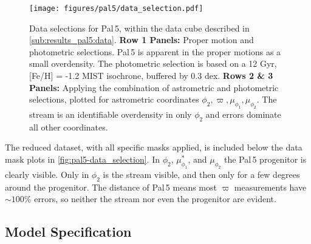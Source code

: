 \documentclass[twocolumn]{aastex631}
\newcommand{\stream}[1]{#1}
\newcommand{\parallax}{\varpi}
\begin{document}
        \begin{figure*}[ht]
            \centering
            \texttt{[image: figures/pal5/data\_selection.pdf]}
            \caption{%
                Data selections for \stream{Pal\,5}, within the data cube
                described in \autoref{sub:results_pal5:data}.
                \textbf{Row 1 Panels:}
                Proper motion and photometric selections.  \stream{Pal\,5} is
                apparent in the proper motions as a small overdensity. The
                photometric selection is based on a 12 Gyr, [Fe/H] = -1.2 MIST
                isochrone, buffered by 0.3 dex.
                \textbf{Rows 2 \& 3 Panels:}
                Applying the combination of astrometric and photometric
                selections, plotted for astrometric coordinates $\phi_2,
                \parallax, \mu_{\phi_1}, \mu_{\phi_2}$.  The stream is an
                identifiable overdensity in only $\phi_2$ and errors dominate
                all other coordinates.  }
            \label{fig:pal5-data_selection}
        \end{figure*}

        The reduced dataset, with all specific masks applied, is included below
        the data mask plots in \autoref{fig:pal5-data_selection}. In $\phi_2$,
        $\mu_{\phi_1}^*$, and $\mu_{\phi_2}$ the \stream{Pal\,5} progenitor is
        clearly visible. Only in $\phi_2$ is the stream visible, and then only
        for a few degrees around the progenitor. The distance of \stream{Pal\,5}
        means most $\parallax$ measurements have $\sim 100\%$ errors, so neither
        the stream nor even the progenitor are evident.
        


    \subsection{Model Specification} \label{sub:results_pal5:model}
\end{document}

